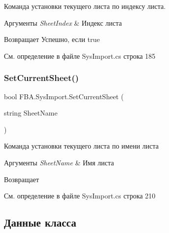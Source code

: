 Команда установки текущего листа по индексу листа. 


\begin{DoxyParams}{Аргументы}
{\em Sheet\+Index} & Индекс листа\\
\hline
\end{DoxyParams}
\begin{DoxyReturn}{Возвращает}
Успешно, если true
\end{DoxyReturn}


См. определение в файле Sys\+Import.\+cs строка 185

\mbox{\label{class_f_b_a_1_1_sys_import_a7b3f7023e3aad70b531bb2e30f315f66}} 
\subsubsection{\texorpdfstring{Set\+Current\+Sheet()}{SetCurrentSheet()}\hspace{0.1cm}{\footnotesize\ttfamily [2/2]}}
{\footnotesize\ttfamily bool F\+B\+A.\+Sys\+Import.\+Set\+Current\+Sheet (\begin{DoxyParamCaption}\item[{string}]{Sheet\+Name }\end{DoxyParamCaption})}



Команда установки текущего листа по имени листа 


\begin{DoxyParams}{Аргументы}
{\em Sheet\+Name} & Имя листа\\
\hline
\end{DoxyParams}
\begin{DoxyReturn}{Возвращает}

\end{DoxyReturn}


См. определение в файле Sys\+Import.\+cs строка 210



\subsection{Данные класса}
\mbox{\label{class_f_b_a_1_1_sys_import_a06f2e2b34e5c33a54a65a3512d39e4a7}} 
